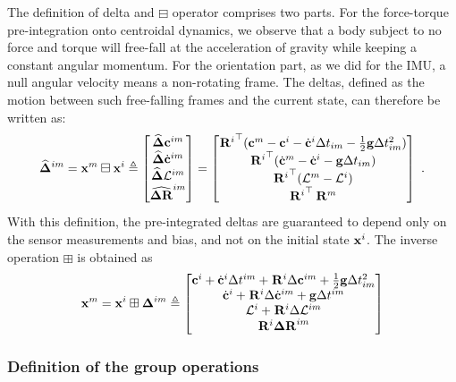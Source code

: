 The definition of delta and $\boxminus$ operator comprises two parts. For the  force-torque pre-integration onto centroidal dynamics, we observe that a body subject to no force and torque will free-fall at the acceleration of gravity while keeping a constant angular momentum. For the orientation part, as we did for the IMU, a null angular velocity means a non-rotating frame. The deltas, defined as the motion between such free-falling frames and the current state, can therefore be written as:
%
\begin{equation}
    \widehat{{{\bm \Delta}}}^{im} = {\bf x}^m \boxminus {\bf x}^i 
    \triangleq
    \begin{bmatrix}
        \widehat{{{\bm \Delta}}}{\bf c}^{im} \\ \widehat{{{\bm \Delta}}}\dot{{\bf c}}^{im} \\ \widehat{{{\bm \Delta}}}\mathcal{L}^{im} \\ \widehat{{\bm \Delta {\bf R}}}^{im}
    \end{bmatrix}
    =
    \begin{bmatrix}
        {\prescript{}{}{{\bf R}}_{}^i}^{\top} ({\bf c}^m - {\bf c}^i - \dot{{\bf c}}^i \Delta t_{im} - \frac{1}{2} {\bf g} \Delta t_{im}^{2})
        \\
        {\prescript{}{}{{\bf R}}_{}^i}^{\top} (\dot{{\bf c}}^{m} - \dot{{\bf c}}^{i} - {\bf g} \Delta t_{im})
        \\
        {\prescript{}{}{{\bf R}}_{}^i}^{\top} (\mathcal{L}^{m} - \mathcal{L}^{i})
        \\
        {\prescript{}{}{{\bf R}}_{}^i}^{\top} \prescript{}{}{{\bf R}}_{}^m
    \end{bmatrix}~.
    \label{eq:com_boxminus}
\end{equation}
%
With this definition, the pre-integrated deltas are guaranteed to depend only on the sensor measurements and bias, and not on the initial state ${\bf x}^i$. The inverse operation $\boxplus$ is obtained as
%
\begin{equation}
    {\bf x}^m = {\bf x}^i \boxplus {{\bm \Delta}}^{im} \triangleq
    \begin{bmatrix}
    {\bf c}^i + \dot{{\bf c}}^i \Delta t^{im} + \prescript{}{}{{\bf R}}_{}^i \Delta {\bf c}^{im} + \frac{1}{2} {\bf g} \Delta t_{im}^{2}
    \\
    \dot{{\bf c}}^i + \prescript{}{}{{\bf R}}_{}^i \Delta \dot{{\bf c}}^{im} + {\bf g} \Delta t^{im}
    \\
    \mathcal{L}^i + \prescript{}{}{{\bf R}}_{}^i \Delta \mathcal{L}^{im}
    \\
    \prescript{}{}{{\bf R}}_{}^i {\bm \Delta {\bf R}}^{im}
    \end{bmatrix}
\end{equation}


\subsubsection{Definition of the group operations}

